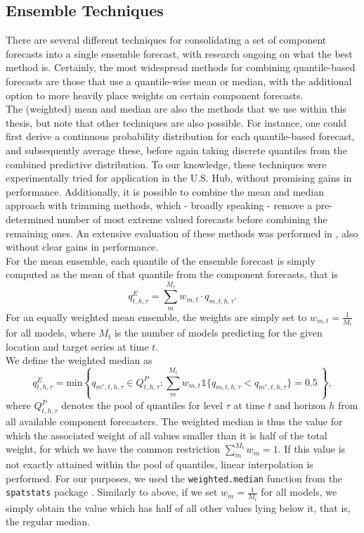 \subsection{Ensemble Techniques} \label{sub:ensemble_techniques}
There are several different techniques for consolidating a set of component forecasts into a single ensemble forecast, with research ongoing on what the best method is. Certainly, the most widespread methods for combining quantile-based forecasts are those that use a quantile-wise mean or median, with the additional option to more heavily place weights on certain component forecasts.\\ 
The (weighted) mean and median are also the methods that we use within this thesis, but note that other techniques are also possible. For instance, one could first derive a continuous probability distribution for each quantile-based forecast, and subsequently average these, before again taking discrete quantiles from the combined predictive distribution. To our knowledge, these techniques were experimentally tried for application in the U.S. Hub, without promising gains in performance. Additionally, it is possible to combine the mean and median approach with trimming methods, which - broadly speaking - remove a pre-determined number of most extreme valued forecasts before combining the remaining ones. An extensive evaluation of these methods was performed in \cite{taylor_combining_2021}, also without clear gains in performance.\\
For the mean ensemble, each quantile of the ensemble forecast is simply computed as the mean of that quantile from the component forecasts, that is
\begin{equation}
q^E_{t,h,\tau} = \sum_m^{M_t} w_{m,t} \cdot q_{m, t, h, \tau}.
\end{equation}
For an equally weighted mean ensemble, the weights are simply set to $w_{m,t} = \frac{1}{M_t}$ for all models, where $M_t$ is the number of models predicting for the given location and target series at time $t$.  \\
We define the weighted median as 
\begin{equation}
q^E_{t,h,\tau} = \text{min}\left\{q_{m^{*},t,h,\tau} \in Q^P_{t,h,\tau}: \sum_m^{M_t}  w_{m,t} \mathbb{1}\{q_{m,t,h,\tau} < q_{m^{*},t,h,\tau} \} = 0.5 \ \right\},
\end{equation}
where $Q^P_{t,h,\tau}$ denotes the pool of quantiles for level $\tau$ at time $t$ and horizon $h$ from all available component forecasters. The weighted median is thus the value for which the associated weight of all values smaller than it is half of the total weight, for which we have the common restriction $\sum_m^{M_t}w_m = 1$. If this value is not exactly attained within the pool of quantiles, linear interpolation is performed. For our purposes, we used the \texttt{weighted.median} function from the \texttt{spatstats} package \citep{baddeley_spatstat_2005}. Similarly to above, if we set $w_m = \frac{1}{M_t}$ for all models, we simply obtain the value which has half of all other values lying below it, that is, the regular median. \\
